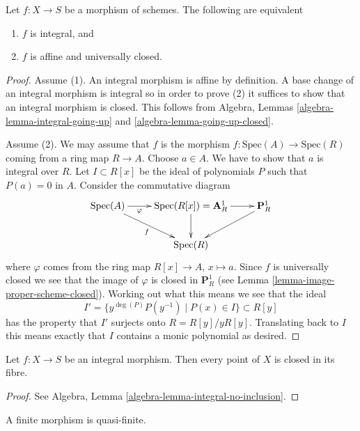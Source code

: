 \begin{lemma}
\label{lemma-integral-universally-closed}
Let $f : X \to S$ be a morphism of schemes.
The following are equivalent
\begin{enumerate}
\item $f$ is integral, and
\item $f$ is affine and universally closed.
\end{enumerate}
\end{lemma}

\begin{proof}
Assume (1). An integral morphism is affine by definition.
A base change of an integral morphism is integral so in order to prove (2)
it suffices to show that an integral morphism is closed.
This follows from Algebra, Lemmas \ref{algebra-lemma-integral-going-up}
and \ref{algebra-lemma-going-up-closed}.

\medskip\noindent
Assume (2). We may assume that $f$ is the morphism
$f : \text{Spec}(A) \to \text{Spec}(R)$ coming from a ring
map $R \to A$. Choose $a \in A$. We have to show that $a$
is integral over $R$. Let $I \subset R[x]$ be the ideal of
polynomials $P$ such that $P(a) = 0$ in $A$. Consider the commutative
diagram
$$
\xymatrix{
\text{Spec}(A) \ar[r]_-\varphi \ar[rd]_f &
\text{Spec}(R[x]) = \mathbf{A}^1_R \ar[r] \ar[d] &
\mathbf{P}^1_R  \ar[ld] \\
& \text{Spec}(R) &
}
$$
where $\varphi$ comes from the ring map $R[x] \to A$, $x \mapsto a$.
Since $f$ is universally closed we see that the image of $\varphi$
is closed in $\mathbf{P}^1_R$
(see Lemma \ref{lemma-image-proper-scheme-closed}). Working
out what this means we see that the ideal
$$
I' = \{ y^{\deg(P)}P(y^{-1}) \mid P(x) \in I \} \subset R[y]
$$
has the property that $I'$ surjects onto $R = R[y]/yR[y]$.
Translating back to $I$ this means exactly that $I$ contains
a monic polynomial as desired.
\end{proof}

\begin{lemma}
\label{lemma-integral-fibres}
Let $f : X \to S$ be an integral morphism.
Then every point of $X$ is closed in its fibre.
\end{lemma}

\begin{proof}
See Algebra, Lemma \ref{algebra-lemma-integral-no-inclusion}.
\end{proof}

\begin{lemma}
\label{lemma-finite-quasi-finite}
A finite morphism is quasi-finite.
\end{lemma}

